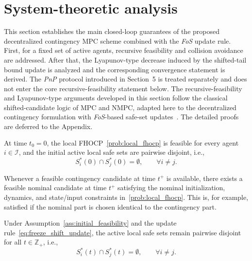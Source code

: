 \documentclass[twocolumn]{autart}
\begin{document}
\section{System-theoretic analysis}
\label{sec:analysis}
This section establishes the main closed-loop guarantees of the proposed decentralized contingency MPC scheme combined with the \textit{FoS} update rule.
First, for a fixed set of active agents, recursive feasibility and collision avoidance are addressed.
After that, the Lyapunov-type decrease induced by the shifted-tail bound update is analyzed and the corresponding convergence statement is derived.
The \emph{PnP} protocol introduced in Section~5 is treated separately and does not enter the core recursive-feasibility statement below.
The recursive-feasibility and Lyapunov-type arguments developed in this section follow the classical shifted-candidate logic of MPC and NMPC, adapted here to the decentralized contingency formulation with \textit{FoS}-based safe-set updates~\cite{ChenAllgoewer1998,Mayne2000}.
The detailed proofs are deferred to the Appendix.
\begin{assumption}
\label{ass:initial_feasibility}
At time $t_0=0$, the local FHOCP~\eqref{prob:local_fhocp} is feasible for every agent $i\in\mathcal I$, and the initial active local safe sets are pairwise disjoint, i.e.,
\[
S_i^\ast(0)\cap S_j^\ast(0)=\emptyset,
\qquad \forall i\neq j.
\]
\end{assumption}

\begin{assumption}
\label{ass:nominal_completion}
Whenever a feasible contingency candidate at time $t^+$ is available, there exists a feasible nominal candidate at time $t^+$ satisfying the nominal initialization, dynamics, and state/input constraints in~\eqref{prob:local_fhocp}.
This is, for example, satisfied if the nominal part is chosen identical to the contingency part.
\end{assumption}

\begin{lemma}
\label{lem:disjoint_invariance}
Under Assumption~\ref{ass:initial_feasibility} and the update rule~\eqref{eq:freeze_shift_update}, the active local safe sets remain pairwise disjoint for all $t\in\mathbb{Z}_+$, i.e.,
\[
S_i^\ast(t)\cap S_j^\ast(t)=\emptyset,
\qquad \forall i\neq j.
\]
\end{lemma}
\end{document}
